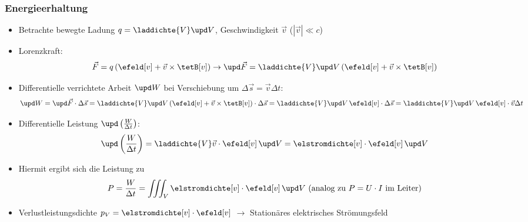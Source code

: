 \begin{frame}
  \frametitle{Energieerhaltung}
  \begin{itemize}[<+->]
  \item Betrachte bewegte Ladung $q = \laddichte{V}\upd V$, Geschwindigkeit $\vec{v}$ ($|\vec{v}| \ll c$)
  \item Lorenzkraft:
    $$
    \vec{F} = q \left( \efeld[v] + \vec{v} \times \tetB[v]\right) \to \upd\vec{F} = \laddichte{V}\upd V \left( \efeld[v] + \vec{v} \times \tetB[v]\right) 
    $$
  \item Differentielle \alert{verrichtete Arbeit} $\upd W$ bei Verschiebung um $\Delta\vec{s} = \vec{v} \Delta t$:
    $$
      \upd W =  \upd\vec{F} \cdot \Delta\vec{s} = \laddichte{V}\upd V \left( \efeld[v] + \vec{v} \times \tetB[v]\right)\cdot \Delta\vec{s}
      = \laddichte{V}\upd V\, \efeld[v] \cdot \Delta\vec{s} = \laddichte{V}\upd V\, \efeld[v] \cdot \vec{v} \Delta t
    $$
  \item Differentielle \alert{Leistung} $\upd\left( \frac{W}{\Delta t}\right)$:
    $$
    \upd\left( \frac{W}{\Delta t}\right) = \laddichte{V}\vec{v}\cdot\efeld[v]\, \upd V = \elstromdichte[v]\cdot\efeld[v]\, \upd V
    $$
  \item Hiermit ergibt sich die \alert{Leistung} zu
    $$
    P = \frac{W}{\Delta t} = \iiint_V \elstromdichte[v]\cdot\efeld[v]\, \upd V \text{ (analog zu } P=U\cdot I \text{ im Leiter)}
    $$
    \item \alert{Verlustleistungsdichte} $p_V=\elstromdichte[v]\cdot\efeld[v]$ $\to$ Stationäres elektrisches Strömungsfeld
  \end{itemize}
\end{frame}

